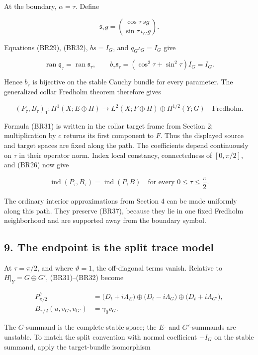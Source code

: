 \documentclass[
  11pt,
]{article}
\begin{document}
At the boundary, \(\alpha=\tau\). Define

\[
 \mathfrak s_\tau g
 =\binom{\cos\tau\,sg}{\sin\tau\,\iota_Gg}.
 \tag{BR34}
\]

Equations (BR29), (BR32), \(bs=I_G\), and \(q_G\iota_G=I_G\) give

\[
 \operatorname{ran}\mathfrak q_\tau
 =\operatorname{ran}\mathfrak s_\tau,\qquad
 b_\tau\mathfrak s_\tau
 =(\cos^2\tau+\sin^2\tau)I_G=I_G .
 \tag{BR35}
\]

Hence \(b_\tau\) is bijective on the stable Cauchy bundle for every
parameter. The generalized collar Fredholm theorem therefore gives

\[
 (P_\tau,B_\tau)_1:
 H^1(X;E\oplus H)\longrightarrow
 L^2(X;F\oplus H)\oplus H^{1/2}(Y;G)
 \quad\text{Fredholm}.
 \tag{BR36}
\]

Formula (BR31) is written in the collar target frame from Section 2;
multiplication by \(c\) returns its first component to \(F\). Thus the
displayed source and target spaces are fixed along the path. The
coefficients depend continuously on \(\tau\) in their operator norm.
Index local constancy, connectedness of \([0,\pi/2]\), and (BR26) now
give

\[
 \operatorname{ind}(P_\tau,B_\tau)
 =\operatorname{ind}(P,B)
 \quad\text{for every }0\leq\tau\leq\frac{\pi}{2}.
 \tag{BR37}
\]

The ordinary interior approximations from Section 4 can be made
uniformly along this path. They preserve (BR37), because they lie in one
fixed Fredholm neighborhood and are supported away from the boundary
symbol.

\subsection{9. The endpoint is the split trace
model}\label{the-endpoint-is-the-split-trace-model}

At \(\tau=\pi/2\), and where \(\vartheta=1\), the off-diagonal terms
vanish. Relative to \(H|_Y=G\oplus G'\), (BR31)--(BR32) become

\[
 \begin{aligned}
 P_{\pi/2}^b
 &=
 \bigl(D_t+i\Lambda_E\bigr)
 \oplus
 \bigl(D_t-i\Lambda_G\bigr)
 \oplus
 \bigl(D_t+i\Lambda_{G'}\bigr),\\
 B_{\pi/2}(u,v_G,v_{G'})
 &=\gamma_0v_G .
 \end{aligned}
 \tag{BR38}
\]

The \(G\)-summand is the complete stable space; the \(E\)- and
\(G'\)-summands are unstable. To match the split convention with normal
coefficient \(-I_G\) on the stable summand, apply the target-bundle
isomorphism
\end{document}
